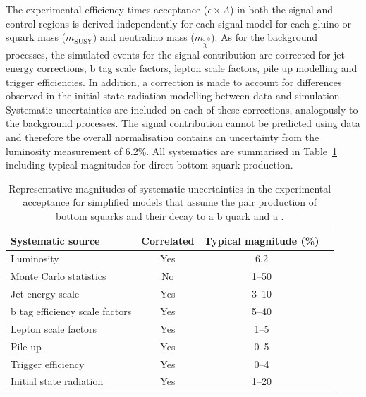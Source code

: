 The experimental efficiency times acceptance ($\epsilon \times A$) in both the signal and 
control regions is derived independently for each signal model for each gluino or squark 
mass ($m_{\text{SUSY}}$) and neutralino mass ($m_{\tilde{\chi}^{0}}$). As for the 
background processes, the simulated events for the signal contribution are corrected for 
jet energy corrections, b tag scale factors, lepton scale factors, pile up modelling and trigger efficiencies.
In addition, a correction is made to account for differences observed in the initial 
state radiation modelling between data and simulation. Systematic uncertainties are included 
on each of these corrections, analogously to the background processes. The signal contribution
cannot be predicted using data and therefore the overall normalisation contains an uncertainty
from the luminosity measurement of 6.2\%. All systematics are summarised
in Table~\ref{tab:signal_systs} including typical magnitudes for direct bottom squark production.

\begin{table}[h!]
  \caption{
    Representative magnitudes of systematic uncertainties in the
    experimental acceptance for simplified models that assume the 
    pair production of bottom squarks and their decay to a b
    quark and a \chiz.}  
  \label{tab:signal_systs}
  \centering
  \footnotesize
  \begin{tabular}{ lccc }
    \hline
    Systematic source\T\B          & Correlated & Typical magnitude (\%) \\
    \hline
    Luminosity\T                   & Yes        & 6.2                    \\
    Monte Carlo statistics         & No         & 1--50                  \\
    Jet energy scale               & Yes        & 3--10                  \\
    b tag efficiency scale factors & Yes        & 5--40                  \\
    Lepton scale factors           & Yes        & 1--5                   \\
    Pile-up                        & Yes        & 0--5                   \\
    Trigger efficiency             & Yes        & 0--4                   \\
    Initial state radiation        & Yes        & 1--20                  \\
    \hline
  \end{tabular}
\end{table}


